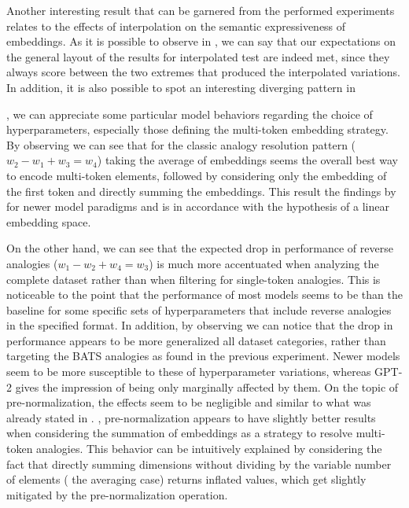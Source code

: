 
Another interesting result that can be garnered from the performed experiments relates to the effects of interpolation on the semantic expressiveness of embeddings.
As it is possible to observe in , we can say that our expectations on the general layout of the results for interpolated test are indeed met, since they always score between the two extremes that produced the interpolated variations.
In addition, it is also possible to spot an interesting diverging pattern in


, we can appreciate some particular model behaviors regarding the choice of hyperparameters, especially those defining the multi-token embedding strategy.
By observing  we can see that for the classic analogy resolution pattern ($w_2 - w_1 + w_3 = w_4$) taking the average of embeddings seems the overall best way to encode multi-token elements, followed by considering only the embedding of the first token and directly summing the embeddings.
This result  the findings  by  for newer model paradigms and is in accordance with the hypothesis of a linear embedding space.

On the other hand, we can see that the expected drop in performance of reverse analogies ($w_1 - w_2 + w_4 = w_3$) is much more accentuated when analyzing the complete dataset rather than when filtering for single-token analogies.
This is noticeable to the point that the performance of most models seems to be  than the baseline for some specific sets of hyperparameters that include reverse analogies in the specified format.
In addition, by observing  we can notice that the drop in performance appears to be more generalized  all dataset categories, rather than targeting the BATS analogies as found in the previous experiment.
Newer models seem to be more susceptible to these  of hyperparameter variations, whereas GPT-2 gives the impression of being only marginally affected by them.
On the topic of pre-normalization, the effects seem to be negligible and similar to what was already stated in .
, pre-normalization appears to have slightly better results when considering the summation of embeddings as a strategy to resolve multi-token analogies.
This behavior can be intuitively explained by considering the fact that directly summing dimensions without dividing by the variable number of elements ( the averaging case) returns inflated values, which get slightly mitigated by the pre-normalization operation.

